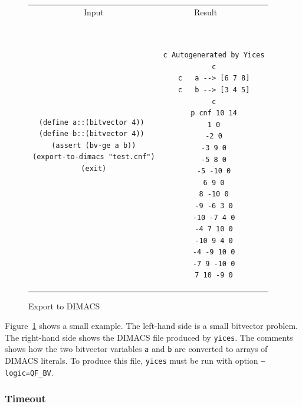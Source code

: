 \documentclass[11pt,twoside,fleqn,openright,titlepage]{cslreport}
\begin{document}
\begin{figure}
\begin{footnotesize}
\begin{center}
\begin{tabular}{c|c}
\multicolumn{1}{c}{Input} & \multicolumn{1}{c}{Result~~~~} \\[0.4em]

\begin{minipage}[c]{6.2cm}
\begin{verbatim}
(define a::(bitvector 4)) 
(define b::(bitvector 4)) 
(assert (bv-ge a b))
(export-to-dimacs "test.cnf")
(exit)
\end{verbatim}
\end{minipage}~~
&
~~~~\begin{minipage}[c]{6cm}
\begin{verbatim}
c Autogenerated by Yices
c
c   a --> [6 7 8]
c   b --> [3 4 5]
c
p cnf 10 14
1 0
-2 0
-3 9 0
-5 8 0
-5 -10 0
6 9 0
8 -10 0
-9 -6 3 0
-10 -7 4 0
-4 7 10 0
-10 9 4 0
-4 -9 10 0
-7 9 -10 0
7 10 -9 0
\end{verbatim}
\end{minipage}
\end{tabular}
\end{center}
\end{footnotesize}
\caption{Export to DIMACS}
\label{export-example}
\end{figure}

Figure~\ref{export-example} shows a small example. The left-hand side
is a small bitvector problem. The right-hand side shows the DIMACS
file produced by \texttt{yices}. The comments shows how the two
bitvector variables \texttt{a} and \texttt{b} are converted to arrays
of DIMACS literals.  To produce this file, \texttt{yices} must be
run with option \texttt{--logic=QF\_BV}.


\subsubsection*{Timeout}
\end{document}
